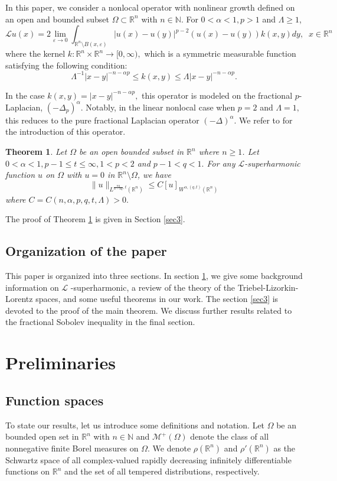 \documentclass[12pt]{amsart}
\newcommand{\R}{\mathbb{R}}
\newcommand{\N}{\mathbb{N}}
\newcommand{\be}{\begin{equation}}
\newcommand{\ee}{\end{equation}}
\numberwithin{equation}{section}
\theoremstyle{plain}
\newtheorem{Thm}{Theorem}[section]
\theoremstyle{definition}
\theoremstyle{remark}
\begin{document}
In this paper, we consider a nonlocal operator with nonlinear growth defined on an open and bounded subset $\Omega\subset\R^{n}$ with $n\in\N$. For $0<\alpha<1,p>1 $ and $\Lambda\geq 1$,
\[
\mathcal{L} u(x)=2 \lim\limits_{\varepsilon\to 0}\int_{\R^n\setminus B(x,\varepsilon)} |u(x)-u(y)|^{p-2}(u(x)-u(y))k(x,y) dy,\;\; x\in\R^{n}
\]
where the kernel $k:\R^{n}\times\R^{n}\to [0,\infty),$ which is a symmetric measurable function satisfying the following condition:
\[
\Lambda^{-1} |x-y|^{-n-\alpha p}\leq k(x,y)\leq \Lambda |x-y|^{-n-\alpha p}.
\]

In the case $k(x,y)=|x-y|^{-n-\alpha p},$ this operator is modeled on the fractional $p$-Laplacian, $(-\Delta_{p})^{\alpha}.$ Notably, in the linear nonlocal case when $p=2$ and $\Lambda=1,$ this reduces to the pure fractional Laplacian operator $(-\Delta)^{\alpha}$. We refer to \cite{Pa} for the introduction of this operator.

\begin{Thm}\label{mainthm}
Let $\Omega$ be an open bounded subset in $\R^{n}$ where $n\geq 1$. Let $0<\alpha<1, p-1\leq t\leq \infty, 1<p<2$ and $p-1<q<1.$ For any $\mathcal{L}$-superharmonic function $u$ on $\Omega$ with $u=0$ in $\R^{n}\setminus\Omega$, we have
\be \label{fracSoboineq}
\|u\|_{L^{\frac{nq}{n-\alpha q},t}(\R^{n})} \leq C [u]_{W^{\alpha,(q,t)}(\R^{n})}
\ee
where $C=C(n,\alpha,p,q,t,\Lambda)>0.$
\end{Thm}
The proof of Theorem \ref{mainthm} is given in Section \ref{sec3}.
\subsection*{Organization of the paper} This paper is organized into three sections. In section \ref{sec2}, we give some background information on $\mathcal{L}$ -superharmonic, a review of the theory of the Triebel-Lizorkin-Lorentz spaces, and some useful theorems in our work. The section \ref{sec3} is devoted to the proof of the main theorem. We discuss further results related to the fractional Sobolev inequality in the final section.
\section{Preliminaries}\label{sec2}
\subsection*{Function spaces}
To state our results, let us introduce some definitions and notation. Let $\Omega$ be an bounded open set in $\R^{n}$ with $n\in\N$ and $\mathcal{M}^{+}(\Omega)$ denote the class of all nonnegative finite Borel measures on $\Omega$. We denote $\rho(\R^{n})$ and  $\rho'(\R^{n})$ as the Schwartz space of all complex-valued rapidly decreasing infinitely differentiable functions on $\R^{n}$ and the set of all tempered distributions, respectively. 
\end{document}
